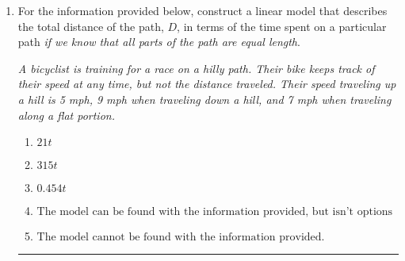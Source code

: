 \documentclass[14pt]{extbook}
\newcommand{\litem}[1]{\item#1\hspace*{-1cm}\rule{\textwidth}{0.4pt}}
\begin{document}
\begin{enumerate}
{\begin{enumerate}[label=\Alph*.]
\end{enumerate} }
\litem{
For the information provided below, construct a linear model that describes the total distance of the path, $D$, in terms of the time spent on a particular path \textit{if we know that all parts of the path are equal length}.
\begin{center}
    \textit{ A bicyclist is training for a race on a hilly path. Their bike keeps track of their speed at any time, but not the distance traveled. Their speed traveling up a hill is 5 mph, 9 mph when traveling down a hill, and 7 mph when traveling along a flat portion. }
\end{center}
\begin{enumerate}[label=\Alph*.]
\item \( 21 t \)
\item \( 315 t \)
\item \( 0.454 t \)
\item \( \text{The model can be found with the information provided, but isn't options 1-3.} \)
\item \( \text{The model cannot be found with the information provided.} \)

\end{enumerate} }
\end{enumerate}
\end{document}
